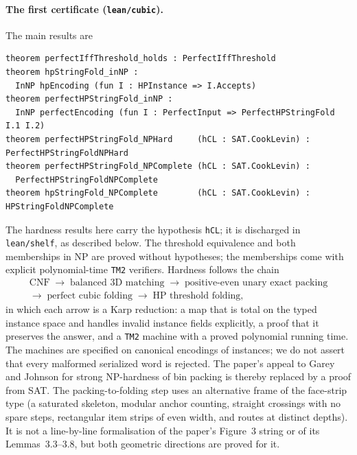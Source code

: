 \documentclass[11pt,letterpaper]{article}
\theoremstyle{definition}
\theoremstyle{remark}
\newcommand{\lean}[1]{\texttt{#1}}
\begin{document}
\paragraph{The first certificate (\lean{lean/cubic}).}
The main results are
{\small
\begin{verbatim}
theorem perfectIffThreshold_holds : PerfectIffThreshold
theorem hpStringFold_inNP :
  InNP hpEncoding (fun I : HPInstance => I.Accepts)
theorem perfectHPStringFold_inNP :
  InNP perfectEncoding (fun I : PerfectInput => PerfectHPStringFold I.1 I.2)
theorem perfectHPStringFold_NPHard     (hCL : SAT.CookLevin) : PerfectHPStringFoldNPHard
theorem perfectHPStringFold_NPComplete (hCL : SAT.CookLevin) :
  PerfectHPStringFoldNPComplete
theorem hpStringFold_NPComplete        (hCL : SAT.CookLevin) : HPStringFoldNPComplete
\end{verbatim}
}
\noindent The hardness results here carry the hypothesis \lean{hCL}; it is discharged in
\lean{lean/shelf}, as described below. The threshold equivalence and both memberships in NP are proved without hypotheses; the
memberships come with explicit polynomial-time \lean{TM2} verifiers. Hardness follows the chain
\begin{multline*}
\text{CNF}\;\to\;\text{balanced 3D matching}\;\to\;\text{positive-even unary exact packing}\\
\to\;\text{perfect cubic folding}\;\to\;\text{HP threshold folding},
\end{multline*}
in which each arrow is a Karp reduction: a map that is total on the typed instance space and handles
invalid instance fields explicitly, a proof that it preserves the answer, and a \lean{TM2} machine
with a proved polynomial running time. The machines are specified on canonical encodings of
instances; we do not assert that every malformed serialized word is rejected. The paper's appeal to
Garey and Johnson for strong NP-hardness of bin packing is thereby replaced by a proof from SAT. The
packing-to-folding step uses an alternative frame of the face-strip type (a saturated skeleton,
modular anchor counting, straight crossings with no spare steps, rectangular item strips of even
width, and routes at distinct depths). It is not a line-by-line formalisation of the paper's Figure~3
string or of its Lemmas~3.3--3.8, but both geometric directions are proved for it.
\end{document}

